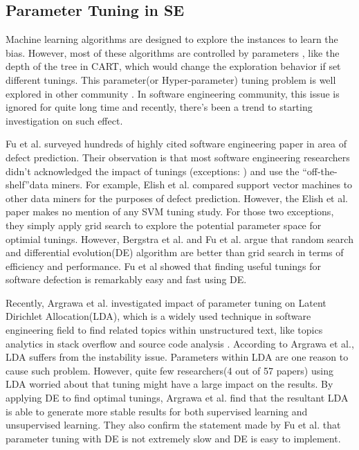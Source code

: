 \subsection{Parameter Tuning in SE}
Machine learning algorithms are designed to explore the instances
to learn the bias. However, most of these algorithms are controlled by parameters
, like the depth of the tree in CART, which would change the
exploration behavior if set different tunings. This parameter(or Hyper-parameter)
tuning problem is well explored in other community \cite{bergstra2012random,li2016hyperband}.
In software engineering community, this issue is ignored for quite
long time and recently, there's been a trend to starting investigation on such effect.

Fu et al.\cite{fu2016tuning} surveyed hundreds of highly 
cited software engineering paper in area of defect prediction. 
Their observation is that most software engineering  researchers
didn't acknowledged the impact of tunings 
(exceptions: \cite{lessmann2008benchmarking,tantithamthavorn2016automated}) and
use the ``off-the-shelf''data miners. For example, 
Elish et al.\cite{elish2008predicting} compared support vector machines
to other data miners for the purposes of defect prediction.
However, the Elish et al. paper makes no mention of any SVM tuning study.
For those two exceptions\cite{lessmann2008benchmarking,tantithamthavorn2016automated}, 
they simply apply grid search to explore the potential parameter space for optimial tunings.
However, Bergstra et al.\cite{bergstra2012random} and 
Fu et al.\cite{fu2016differential} argue that random search and 
differential evolution(DE) algorithm are better than 
grid search in terms of efficiency and performance.
Fu et al showed that finding useful tunings for software defection is remarkably easy and fast using DE.

Recently, Argrawa et al.\cite{agrawal2016wrong} investigated 
impact of parameter tuning on Latent Dirichlet Allocation(LDA),
which is a widely used technique in software engineering field
to find related topics within unstructured text, 
like topics analytics in stack overflow \cite{barua2014developers}
and source code analysis \cite{binkley2014understanding}.
According to Argrawa et al., LDA suffers from the instability issue.
Parameters within LDA are one reason to cause such problem. However,
quite few researchers(4 out of 57 papers) using LDA worried about
that tuning might have a large impact on the results. By applying DE to find 
optimal tunings,  Argrawa et al. find that the resultant LDA is able to generate more stable results
for both supervised learning and unsupervised learning.
They also confirm the statement made by Fu et al.\cite{fu2016tuning} that
parameter tuning with DE is not extremely slow and DE is easy to implement.

